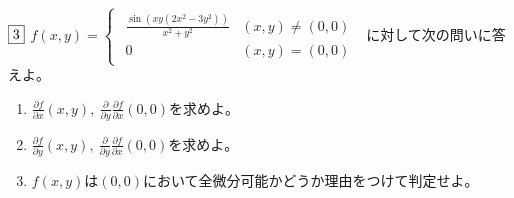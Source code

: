 \begin{tcolorbox} %
	$\fbox{3}$ 
$f(x, y)= 
\begin{cases}
\begin{matrix}
	\frac{\sin{(xy(2x^2- 3y^2))}}{x^2+ y^2}& (x, y)\ne (0, 0)\\
	0& (x, y)= (0, 0)
\end{matrix}
\end{cases}
$
	に対して次の問いに答えよ。
\begin{enumerate}
	\item $\frac{\partial f}{\partial x}(x, y),\ \frac{\partial}{\partial y}\frac{\partial f}{\partial x}(0, 0)$を求めよ。
	\item $\frac{\partial f}{\partial y}(x, y),\ \frac{\partial}{\partial y}\frac{\partial f}{\partial x}(0, 0)$を求めよ。
	\item $f(x, y)$は$(0, 0)$において全微分可能かどうか理由をつけて判定せよ。
\end{enumerate}
\end{tcolorbox}


